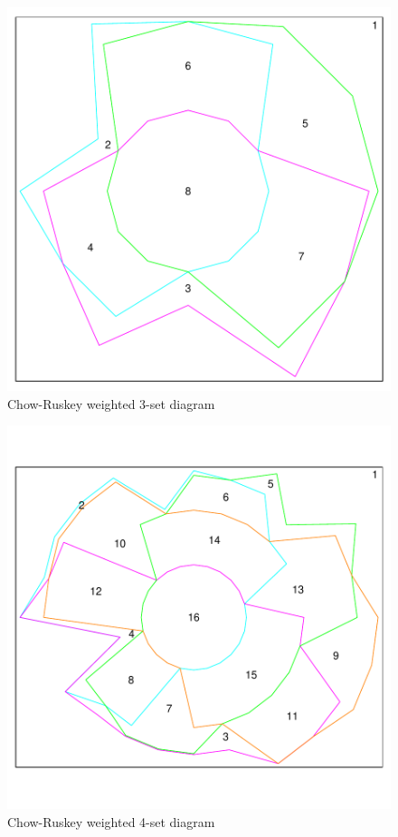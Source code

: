 \documentclass[a4paper]{article}
\begin{document}
\begin{figure}[H]\begin{center}
\includegraphics{Vennfig-plotCR3}
\caption{Chow-Ruskey weighted 3-set diagram}
\end{center}
\end{figure}

\begin{figure}[H]\begin{center}
\includegraphics{Vennfig-plotCR4}
\caption{Chow-Ruskey weighted 4-set diagram}
\end{center}
\end{figure}
\end{document}
